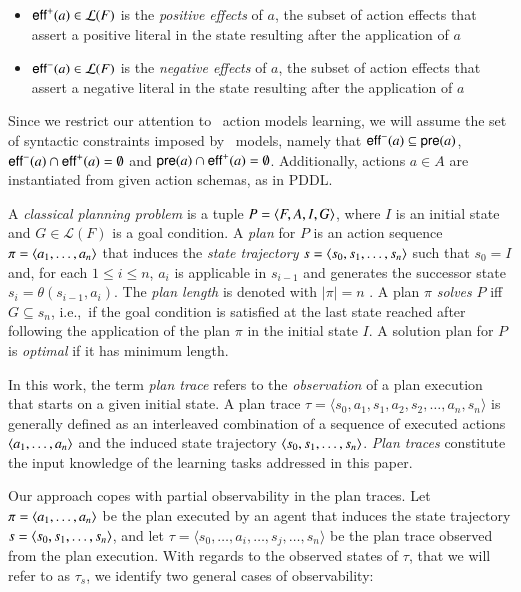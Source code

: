 \begin{itemize}
\item $\mathsf{eff}^+(a)\in\mathcal{L}(F)$ is the {\em positive effects} of $a$, the subset of action effects that assert a positive literal in the state resulting after the application of $a$
\item $\mathsf{eff}^-(a)\in\mathcal{L}(F)$ is the {\em negative effects} of $a$, the subset of action effects that assert a negative literal in the state resulting after the application of $a$
\end{itemize}

Since we restrict our attention to \strips\ action models learning, we will assume the set of syntactic constraints imposed by \strips\ models, namely that $\mathsf{eff}^-(a)\subseteq \mathsf{pre}(a)$, $\mathsf{eff}^-(a)\cap \mathsf{eff}^+(a)=\emptyset$ and $\mathsf{pre}(a)\cap \mathsf{eff}^+(a)=\emptyset$. Additionally, actions $a\in A$ are instantiated from given action schemas, as in PDDL.


A {\em classical planning problem} is a tuple $P={\langle F,A,I,G \rangle}$, where $I$ is an initial state and $G\in\mathcal{L}(F)$ is a goal condition. A {\em plan} for $P$ is an action sequence $\pi={\langle a_1, \ldots, a_n \rangle}$ that induces the {\em state trajectory} $s={\langle s_0, s_1, \ldots, s_n \rangle}$ such that $s_0=I$ and, for each {\small $1\leq i\leq n$}, $a_i$ is applicable in $s_{i-1}$ and generates the successor state $s_i=\theta(s_{i-1},a_i)$. The {\em plan length} is denoted with $|\pi|=n$ . A plan $\pi$ {\em solves} $P$ iff $G\subseteq s_n$, i.e.,~if the goal condition is satisfied at the last state reached after following the application of the plan $\pi$ in the initial state $I$. A solution plan for $P$ is {\em optimal} if it has minimum length.

In this work, the term \emph{plan trace} refers to the \emph{observation} of a plan execution that starts on a given initial state. A plan trace $\tau = \langle s_0, a_1, s_1, a_2, s_2, \ldots, a_n, s_n \rangle$ is generally defined as an interleaved combination of a sequence of executed actions ${\langle a_1, \ldots, a_n \rangle}$ and the induced state trajectory ${\langle s_0, s_1, \ldots, s_n \rangle}$. \emph{Plan traces} constitute the input knowledge of the learning tasks addressed in this paper.

Our approach copes with partial observability in the plan traces. Let $\pi={\langle a_1, \ldots, a_n \rangle}$ be the plan executed by an agent that induces the state trajectory $s={\langle s_0, s_1, \ldots, s_n \rangle}$, and let $\tau = \langle s_0, \ldots, a_i, \ldots, s_j, \ldots, s_n \rangle$ be the plan trace observed from the plan execution. With regards to the observed states of $\tau$, that we will refer to as $\tau_s$, we identify two general cases of observability:

